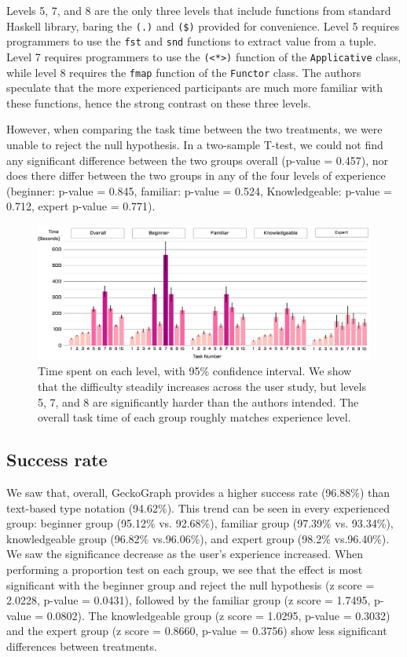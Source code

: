 \documentclass[preprint,12pt]{elsarticle}
\begin{document}
Levels 5, 7, and 8 are the only three levels that include functions from standard Haskell library, baring the \texttt{(.)} and \texttt{(\$)} provided for convenience. Level 5 requires programmers to use the \texttt{fst} and \texttt{snd} functions to extract value from a tuple. Level 7 requires programmers to use the \texttt{(<*>)} function of the \texttt{Applicative} class, while level 8 requires the \texttt{fmap} function of the \texttt{Functor} class. The authors speculate that the more experienced participants are much more familiar with these functions, hence the strong contrast on these three levels. 

However, when comparing the task time between the two treatments, we were unable to reject the null hypothesis. In a two-sample T-test, we could not find any significant difference between the two groups overall (p-value = 0.457), nor does there differ between the two groups in any of the four levels of experience (beginner: p-value = 0.845, familiar: p-value = 0.524, Knowledgeable: p-value = 0.712, expert p-value = 0.771).

\begin{figure}[]
  \includegraphics[width=\linewidth]{figures/LevelTime}
  \caption{\label{fig:level-time} Time spent on each level, with 95\% confidence interval. We show that the difficulty steadily increases across the user study, but levels 5, 7, and 8 are significantly harder than the authors intended. The overall task time of each group roughly matches experience level.}
\end{figure}

\subsection{Success rate}
We saw that, overall, GeckoGraph provides a higher success rate (96.88\%) than text-based type notation (94.62\%). This trend can be seen in every experienced group: beginner group (95.12\% vs. 92.68\%), familiar group (97.39\% vs. 93.34\%), knowledgeable group (96.82\% vs.96.06\%), and expert group (98.2\% vs.96.40\%). We saw the significance decrease as the user's experience increased. When performing a proportion test on each group, we see that the effect is most significant with the beginner group and reject the null hypothesis (z score = 2.0228, p-value = 0.0431), followed by the familiar group (z score = 1.7495, p-value = 0.0802). The knowledgeable group (z score = 1.0295, p-value = 0.3032) and the expert group (z score = 0.8660, p-value = 0.3756) show less significant differences between treatments. 
\end{document}
